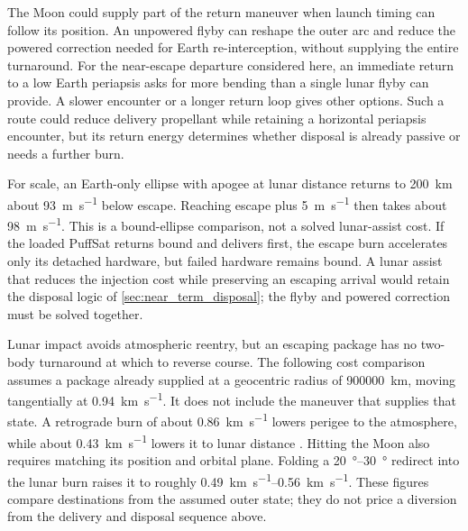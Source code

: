 \documentclass{article}
\begin{document}
The Moon could supply part of the return maneuver when launch timing can follow its position. An unpowered flyby can reshape the outer arc and reduce the powered correction needed for Earth re-interception, without supplying the entire turnaround. For the near-escape departure considered here, an immediate return to a low Earth periapsis asks for more bending than a single lunar flyby can provide. A slower encounter or a longer return loop gives other options. Such a route could reduce delivery propellant while retaining a horizontal periapsis encounter, but its return energy determines whether disposal is already passive or needs a further burn.

For scale, an Earth-only ellipse with apogee at lunar distance returns to \SI{200}{\kilo\meter} about \SI{93}{\meter\per\second} below escape. Reaching escape plus \SI{5}{\meter\per\second} then takes about \SI{98}{\meter\per\second}. This is a bound-ellipse comparison, not a solved lunar-assist cost. If the loaded PuffSat returns bound and delivers first, the escape burn accelerates only its detached hardware, but failed hardware remains bound. A lunar assist that reduces the injection cost while preserving an escaping arrival would retain the disposal logic of \autoref{sec:near_term_disposal}; the flyby and powered correction must be solved together.

Lunar impact avoids atmospheric reentry, but an escaping package has no two-body turnaround at which to reverse course. The following cost comparison assumes a package already supplied at a geocentric radius of \SI{900000}{\kilo\meter}, moving tangentially at \SI{0.94}{\kilo\meter\per\second}. It does not include the maneuver that supplies that state. A retrograde burn of about \SI{0.86}{\kilo\meter\per\second} lowers perigee to the atmosphere, while about \SI{0.43}{\kilo\meter\per\second} lowers it to lunar distance \cite{Katz_aim_is_all_you_need_2025}. Hitting the Moon also requires matching its position and orbital plane. Folding a \SIrange{20}{30}{\degree} redirect into the lunar burn raises it to roughly \SIrange{0.49}{0.56}{\kilo\meter\per\second}. These figures compare destinations from the assumed outer state; they do not price a diversion from the delivery and disposal sequence above.
\end{document}
